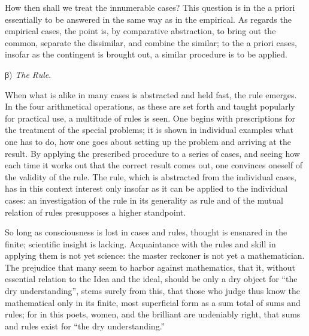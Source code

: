 \documentclass[12pt,a4paper,openany]{book}
\newcommand{\opage}[1]{\marginnote{\footnotesize\textit{[#1]}}}
\begin{document}
How then shall we treat the innumerable cases?
This question is in the a priori essentially to be answered
in the same way as in the empirical. As regards the empirical
cases, the point is, by comparative
abstraction, to bring out the common, separate the dissimilar,
and combine the similar; to the a priori cases, insofar
as the contingent is brought out, a similar procedure
is to be applied.

\begin{center}β) \emph{The Rule}.\end{center}

When what is alike in many cases is abstracted and held fast,
the rule emerges. In the four arithmetical operations, as
these are set forth and taught popularly for practical
use, a multitude of rules is seen. One begins with prescriptions
for the treatment of the special problems; it is shown
in individual examples what one has to do, how one
goes about setting up the problem and arriving at the result.
By applying the prescribed procedure to a
series of cases, and seeing how each time it works out
that the correct result comes out, one convinces oneself of the validity of the rule. The rule, which is abstracted from the individual
cases, has in this context interest only insofar as it can be applied to the individual cases: an
investigation of the rule in its generality as rule and of
the mutual relation of rules presupposes a higher standpoint.

So long as consciousness is lost in cases and rules,
thought is ensnared in the finite; scientific insight
is lacking. Acquaintance with the rules and skill in
applying them is not yet science: the master reckoner is
not yet a mathematician. The prejudice that many seem to
harbor against mathematics, that it, without essential relation
to the Idea and the ideal, should be only a dry object
for ``the dry understanding'', stems surely from this, that those who
judge thus know the mathematical only in its
\setcounter{footnote}{0}%
\opage{15}finite, most superficial form as a sum total of sums
and rules; for in this poets, women, and
the brilliant are undeniably right, that sums and rules exist for
``the dry understanding.''
\end{document}
